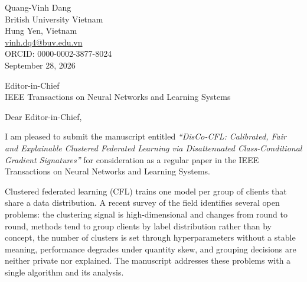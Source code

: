 \documentclass[10pt]{article}
\begin{document}
\begin{flushright}
Quang-Vinh Dang\\ British University Vietnam\\ Hung Yen, Vietnam\\ \href{mailto:vinh.dq4@buv.edu.vn}{vinh.dq4@buv.edu.vn}\\ ORCID: 0000-0002-3877-8024\\[0.8em]
September 28, 2026
\end{flushright}

Editor-in-Chief\\
IEEE Transactions on Neural Networks and Learning Systems

Dear Editor-in-Chief,


I am pleased to submit the manuscript entitled \emph{``DisCo-CFL: Calibrated, Fair and Explainable Clustered Federated Learning via Disattenuated Class-Conditional Gradient Signatures''} for consideration as a regular paper in the IEEE Transactions on Neural Networks and Learning Systems.

Clustered federated learning (CFL) trains one model per group of clients that share a data distribution. A recent survey of the field identifies several open problems: the clustering signal is high-dimensional and changes from round to round, methods tend to group clients by label distribution rather than by concept, the number of clusters is set through hyperparameters without a stable meaning, performance degrades under quantity skew, and grouping decisions are neither private nor explained. The manuscript addresses these problems with a single algorithm and its analysis.
\end{document}
